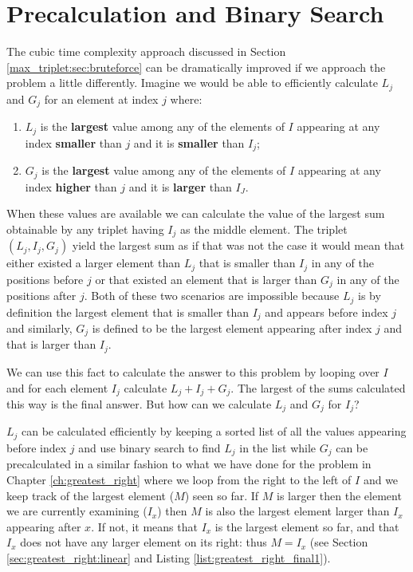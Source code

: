


\section{Precalculation and Binary Search}
The cubic time complexity approach discussed in Section \ref{max_triplet:sec:bruteforce} can be
dramatically improved if we approach the problem a little differently. Imagine we would be able to
efficiently calculate $L_j$ and $G_j$ for an element at index $j$ where:
\begin{enumerate}
	\item $L_j$ is the \textbf{largest} value among any of the elements of $I$ appearing at any
	index \textbf{smaller} than $j$ and it is \textbf{smaller} than $I_j$;
	\item $G_j$ is the \textbf{largest} value among any of the elements of $I$ appearing at any
	index \textbf{higher} than $j$ and it is \textbf{larger} than $I_J$.
\end{enumerate}
When these values are available we can calculate the value of the largest sum obtainable by any
triplet having $I_j$  as the middle element. The triplet $(L_j, I_j, G_j)$ yield the largest sum
as if that was not the case it would mean that either existed a larger element than $L_j$ that is smaller
than $I_j$ in any of the positions before $j$ or that existed an element that is larger than $G_j$
in any of the positions after $j$. 
Both of these two scenarios are impossible  because $L_j$ is by
definition the largest element that is smaller than $I_j$ and appears before index $j$  and
similarly,  $G_j$ is defined to be the largest element appearing after index $j$ and that is larger
than $I_j$.

We can use this fact to calculate the answer to this problem by looping over $I$ and for each
element $I_j$ calculate $L_j+ I_j+ G_j$. The largest of the sums calculated this way is the final
answer. But how can we calculate $L_j$ and $G_j$ for $I_j$?

$L_j$ can be calculated efficiently by keeping a sorted list of all the values appearing before
index $j$ and use binary search to find $L_j$ in the list while $G_j$ can be precalculated in a
similar fashion to what we have done for the problem in Chapter \ref{ch:greatest_right} where we loop
from the right to the left of $I$ and we keep track of the largest element ($M$) seen so far. If $M$ is larger
then the element we are currently examining ($I_x$) then $M$ is also the largest element larger than $I_x$ appearing after $x$.
If not, it means that $I_x$ is the largest element so far, and that $I_x$ does not have any larger element on its right: thus $M = I_x$ (see Section \ref{sec:greatest_right:linear} and Listing \ref{list:greatest_right_final1}).
